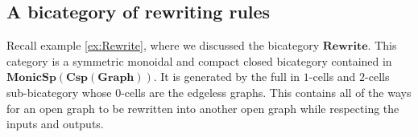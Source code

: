\documentclass[11pt]{amsart}
\newcommand{\cat}[1]{\mathbf{#1}}
\newcommand{\bimonspcsp}[1]{\mathbf{MonicSp(Csp(#1))}}
\theoremstyle{remark}
\theoremstyle{definition}
\begin{document}
\subsection{A bicategory of rewriting rules} %
\label{subsec:RevisitExs}

Recall example \ref{ex:Rewrite}, where we discussed the bicategory $\cat{Rewrite}$. This category is a symmetric monoidal and compact closed bicategory contained in $\bimonspcsp{Graph}$.  It is generated by the full in $1$-cells and $2$-cells sub-bicategory whose $0$-cells are the edgeless graphs. This contains all of the ways for an open graph to be rewritten into another open graph while respecting the inputs and outputs. 
\end{document}
